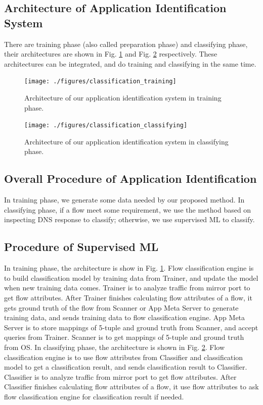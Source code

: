 \documentclass[journal]{IEEEtran}
\begin{document}
\subsection{Architecture of Application Identification System}
There are training phase (also called preparation phase) and classifying phase,
their architectures are shown in Fig. \ref{fig:class_training} and Fig. \ref{fig:class_classifying} respectively.
These architectures can be integrated, and do training and classifying in the same time.

\begin{figure}[!t]
\centering
\texttt{[image: ./figures/classification\_training]}
\caption{Architecture of our application identification system in training phase.}
\label{fig:class_training}
\end{figure}

\begin{figure}[!t]
\centering
\texttt{[image: ./figures/classification\_classifying]}
\caption{Architecture of our application identification system in classifying phase.}
\label{fig:class_classifying}
\end{figure}



\subsection{Overall Procedure of Application Identification}
In training phase, we generate some data needed by our proposed method.
In classifying phase, if a flow meet some requirement, we use the method based on inspecting DNS response to classify;
otherwise, we use supervised ML to classify.

\subsection{Procedure of Supervised ML}
In training phase, the architecture is show in Fig. \ref{fig:class_training}.
Flow classification engine is to build classification model by training data from Trainer,
and update the model when new training data comes.
Trainer is to analyze traffic from mirror port to get flow attributes.
After Trainer finishes calculating flow attributes of a flow,
it gets ground truth of the flow from Scanner or App Meta Server to generate training data,
and sends training data to flow classification engine.
App Meta Server is to store mappings of 5-tuple and ground truth from Scanner, and accept queries from Trainer.
Scanner is to get mappings of 5-tuple and ground truth from OS.
In classifying phase, the architecture is shown in Fig. \ref{fig:class_classifying}.
Flow classification engine is to use flow attributes from Classifier and classification model to get a classification result,
and sends classification result to Classifier.
Classifier is to analyze traffic from mirror port to get flow attributes.
After Classifier finishes calculating flow attributes of a flow,
it use flow attributes to ask flow classification engine for classification result if needed.
\end{document}
